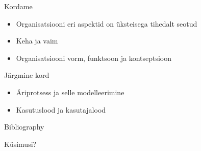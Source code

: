 \documentclass{beamer}
\begin{document}
\begin{frame}{Kordame}
	\begin{itemize}
		\item Organisatsiooni eri aspektid on üksteisega tihedalt seotud
		\item Keha ja vaim
		\item Organisatsiooni vorm, funktsoon ja kontseptsioon
	\end{itemize}
\end{frame}

\begin{frame}{Järgmine kord}
\begin{itemize}
	\item Äriprotsess ja selle modelleerimine
	\item Kasutuslood ja kasutajalood
	\end{itemize}
\end{frame}

\begin{frame}{Bibliography}
	
	
\end{frame}

\begin{frame}[standout]
Küsimusi?
\end{frame}
\end{document}
